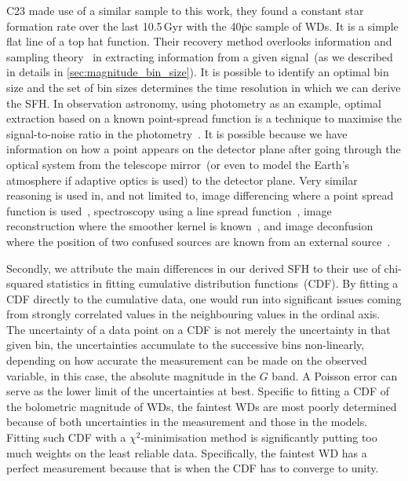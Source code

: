 \documentclass[fleqn,usenatbib]{mnras}
\begin{document}
C23 made use of a similar sample to this work, they found a constant star 
formation rate over the last 10.5\,Gyr 
with the 40\.pc sample of WDs. It is a simple flat line of a top hat function. 
Their recovery method overlooks information and sampling 
theory~\citep{1949IEEEP..37...10S} in extracting information from a given
signal~(as we described in details in \ref{sec:magnitude_bin_size}). It is 
possible to identify an optimal bin size and the set of bin sizes determines
the time resolution in which we can derive the SFH. In observation astronomy,
using photometry as an example, optimal extraction based on a known
point-spread function is a technique to maximise the signal-to-noise ratio in
the photometry~\citep{1980SPIE..264..171T, 1987PASP...99..191S}. It is possible
because we have information on how a point appears on the detector plane after 
going through the optical system from the telescope mirror~(or even to model
the Earth's atmosphere if adaptive optics is used) to the detector plane. Very 
similar reasoning is used in, and not limited to, image differencing where a
point spread function is used~\citep{1998ApJ...503..325A, 2008MNRAS.386L..77B, 
2009MNRAS.397.2099A, 2016ApJ...830...27Z}, spectroscopy using a line spread
function~\citep{1986PASP...98..609H, 1989PASP..101.1032M, 2003PASP..115..688K},
image reconstruction where the smoother kernel is
known~\citep{1972JOSA...62...55R, 1974AJ.....79..745L}, and image
deconfusion where the position of two confused sources are known from an
external source~\citep{2015A&A...582A..15M}.

Secondly, we attribute the main differences in our derived SFH to their
use of chi-squared statistics in fitting cumulative distribution
functions~(CDF). By fitting a CDF directly to the cumulative data, one would
run into significant issues coming from strongly correlated values in the
neighbouring values in the ordinal axis. The uncertainty of a data point on
a CDF is not merely the uncertainty in that given bin, the uncertainties
accumulate to the successive bins non-linearly, depending on how accurate the
measurement can be made on the observed variable, in this case, the absolute
magnitude in the $G$ band. A Poisson error can serve as the lower limit of
the uncertainties at best. Specific to fitting a CDF of the bolometric
magnitude of WDs, the faintest WDs are most poorly determined because of both
uncertainties in the measurement and those in the models. Fitting such CDF
with a $\chi^2$-minimisation method is significantly putting too much weights
on the least reliable data. Specifically, the faintest WD has a perfect
measurement because that is when the CDF has to converge to unity.
\end{document}
